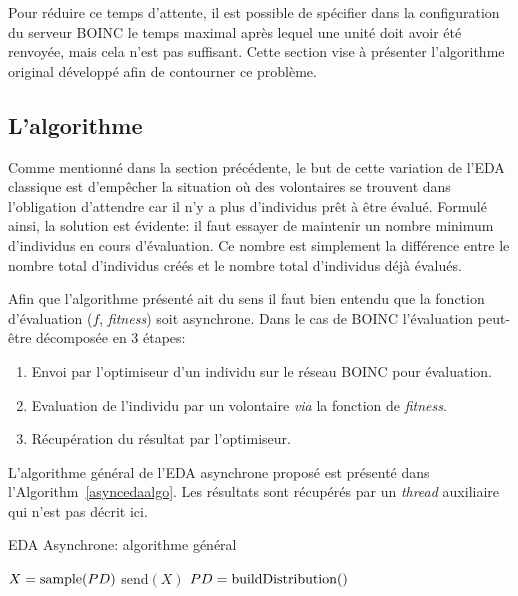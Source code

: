 \documentclass[a4paper, 11pt]{report}
\begin{document}
Pour réduire ce temps d'attente, il est possible de spécifier dans la configuration du serveur \textsc{BOINC} le temps maximal après lequel une unité doit avoir été renvoyée, mais cela n'est pas suffisant. Cette section vise à présenter l'algorithme original développé afin de contourner ce problème.

\subsection{L'algorithme}
Comme mentionné dans la section précédente, le but de cette variation de l'EDA classique est d'empêcher la situation où des volontaires se trouvent dans l'obligation d'attendre car il n'y a plus d'individus prêt à être évalué. Formulé ainsi, la solution est évidente: il faut essayer de maintenir un nombre minimum d'individus en cours d'évaluation. Ce nombre est simplement la différence entre le nombre total d'individus créés et le nombre total d'individus déjà évalués. 

Afin que l'algorithme présenté ait du sens il faut bien entendu que la fonction d'évaluation ($f$, \textit{fitness}) soit asynchrone. Dans le cas de \textsc{BOINC} l'évaluation peut-être décomposée en 3 étapes:
\begin{enumerate}[1)]
\item Envoi par l'optimiseur d'un individu sur le réseau \textsc{BOINC} pour évaluation.
\item Evaluation de l'individu par un volontaire \textit{via} la fonction de \textit{fitness}.
\item Récupération du résultat par l'optimiseur.
\end{enumerate}

L'algorithme général de l'EDA asynchrone proposé est présenté dans l'Algorithm~\ref{asyncedaalgo}. Les résultats sont récupérés par un \textit{thread} auxiliaire qui n'est pas décrit ici. 


\begin{algorithm}                      
\caption{EDA Asynchrone: algorithme général}          
\label{asyncedaalgo}                           
\begin{algorithmic}   
\STATE $X = \textnormal{sample}(PD)$
\STATE send$(X)$
\ENDIF
{}
\STATE $PD = \textnormal{buildDistribution}()$
\ENDIF
\ENDWHILE
             
\end{algorithmic}
\end{algorithm}
\end{document}
